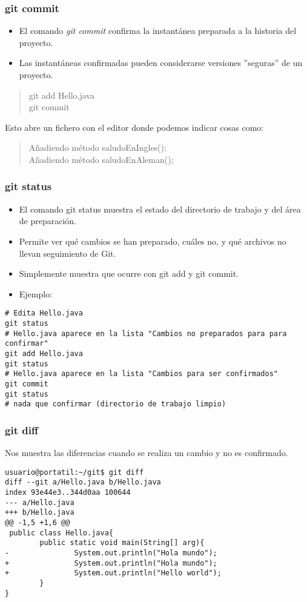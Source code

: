 \documentclass{beamer}
\begin{document}
\begin{frame}
\frametitle{git commit}
\begin{itemize}[<+->]
\item El comando \emph{git commit} confirma la instantánea preparada a la historia del proyecto. 
\item Las instantáneas confirmadas pueden considerarse versiones ''seguras'' de un proyecto.
\end{itemize}
\pause
\begin{verse}
git add Hello.java\\
git commit
\end{verse}
\pause
Esto abre un fichero con el editor donde podemos indicar cosas como:
\begin{verse}
Añadiendo método saludoEnIngles();\\
Añadiendo método saludoEnAleman();
\end{verse}
\end{frame}



\begin{frame}[fragile]
\frametitle{git status}
\begin{itemize}[<+->]
\item El comando git status muestra el estado del directorio de trabajo y del área de preparación. 
\item Permite ver qué cambios se han preparado, cuáles no, y qué archivos no llevan seguimiento de Git.
\item Simplemente muestra que ocurre con git add y git commit. 
\item Ejemplo:
\end{itemize}
\pause

\begin{scriptsize}
\begin{verbatim}
# Edita Hello.java
git status
# Hello.java aparece en la lista "Cambios no preparados para para confirmar"
git add Hello.java
git status
# Hello.java aparece en la lista "Cambios para ser confirmados"
git commit
git status
# nada que confirmar (directorio de trabajo limpio)
\end{verbatim}
\end{scriptsize}
\end{frame}

\begin{frame}[fragile]
\frametitle{git diff} 
Nos muestra las diferencias cuando se realiza un cambio y no es confirmado.
\begin{verbatim}
usuario@portatil:~/git$ git diff
diff --git a/Hello.java b/Hello.java
index 93e44e3..344d0aa 100644
--- a/Hello.java
+++ b/Hello.java
@@ -1,5 +1,6 @@
 public class Hello.java{
        public static void main(String[] arg){
-               System.out.println("Hola mundo");
+               System.out.println("Hola mundo");       
+               System.out.println("Hello world");      
        }
}
\end{verbatim}
\end{frame}
\end{document}
